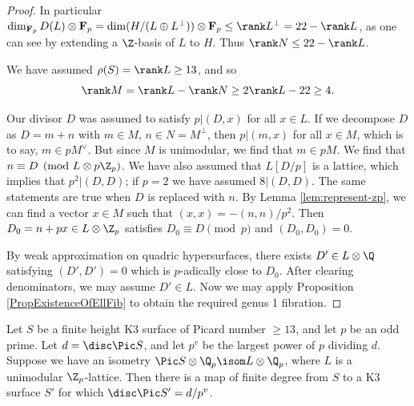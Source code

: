 \documentclass{article}
\def\F{\mathbf{F}}
\begin{document}
\begin{proof}
In particular $\dim_{\F_p} D(L)\otimes\F_p = \dim (H/(L\oplus L^\perp))\otimes\F_p\leq \rank L^\perp=22-\rank L$, as one can see by extending a $\Z$-basis of $L$ to $H$.  Thus $\rank N\leq 22-\rank L$.

We have assumed $\rho(S)=\rank L\geq 13$, and so
\[ \rank M=\rank L -\rank N \geq 2\rank L - 22 \geq 4.\]

Our divisor $D$ was assumed to satisfy $p\vert (D,x)$ for all $x\in L$.   If we decompose $D$ as $D=m+n$ with $m\in M$, $n\in N=M^\perp$, then $p\vert (m,x)$ for all $x\in M$, which is to say, $m\in pM^\vee$.  But since $M$ is unimodular, we find that $m\in pM$.  We find that $n\equiv D\pmod{L\otimes p\Z_p}$.   We have also assumed that $L[D/p]$ is a lattice, which implies that $p^2\vert (D,D)$;  if $p=2$ we have assumed $8\vert (D,D)$.  The same statements are true when $D$ is replaced with $n$.   By Lemma \ref{lem:represent-zp}, we can find a vector $x\in M$ such that $(x,x)=-(n,n)/p^2$.  Then $D_0=n+px\in L\otimes\Z_p$ satisfies $D_0\equiv D\pmod{p}$ and $(D_0,D_0)=0$.

By weak approximation on quadric hypersurfaces, there exists $D'\in L\otimes\Q$ satisfying $(D',D')=0$ which is $p$-adically close to $D_0$.  After clearing denominators, we may assume $D'\in L$.  Now we may apply Proposition
  \ref{PropExistenceOfEllFib} to obtain the required genus 1  fibration.  
  
\end{proof}

\begin{cor}\label{cor:drop-p}
  Let $S$ be a finite height K3 surface of Picard number $\ge 13$, and let
$p$ be an odd prime.   Let $d=\disc \Pic S$, and let $p^v$ be the largest power of $p$ dividing $d$.  Suppose we have an isometry
  $\Pic S \otimes \Q_p \isom L \otimes \Q_p$, where $L$ is a unimodular $\Z_p$-lattice.  Then there is a map of finite degree from $S$
  to a K3 surface $S'$ for which $\disc \Pic S'=d/p^v$.  
\end{cor}
\end{document}
